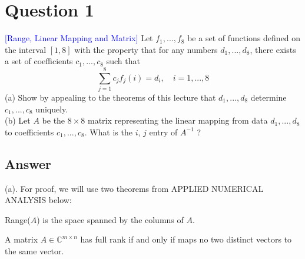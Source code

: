 \section*{Question 1}
\textcolor{blue}{[Range, Linear Mapping and Matrix]}
Let $f_1, ..., f_8$ be a set of functions defined on the interval $[1, 8]$ 
with the property that for any numbers $d_1, ..., d_8$, 
there exists a set of  coefficients $c_1, ..., c_8$ such that
 \begin{equation*}
     \sum_{j=1}^8 c_jf_j(i) = d_i,\quad i=1, ..., 8
 \end{equation*}
(a) Show by appealing to the theorems of this lecture 
that $d_1, ..., d_8$ determine $c_1, ..., c_8$ uniquely.
\\
(b)  Let $A$ be the $8 \times 8$ matrix representing the linear mapping 
from data $d_1, ..., d_8$ to coefficients $c_1, ..., c_8$.
What is the $i$, $j$ entry of $A^{-1}$ ?


\subsection*{Answer}
(a). 
For proof, we will use two theorems from APPLIED NUMERICAL
ANALYSIS below:
\begin{theorem}
\label{theorem:range}
Range($A$) is the space spanned by the columns of $A$.
\end{theorem}

\begin{theorem}
\label{theorem:fullrank}
A matrix $A \in \mathbb{C}^{m \times n}$ has full rank 
if and only if maps no two distinct vectors to the same vector.
\end{theorem}

